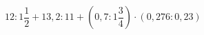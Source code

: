 \begin{ex}[type=calculate]
	\begin{condition}
		\( 12:1\dfrac{1}{2}+13,2:11+\left( 0,7:1\dfrac{3}{4} \right)\cdot(0,276:0,23) \)
	\end{condition}
	\answer{}
\end{ex}